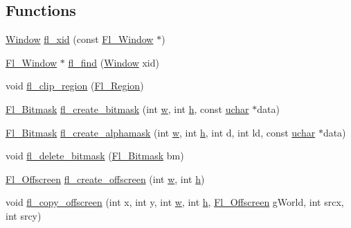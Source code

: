 \subsection*{Functions}
\begin{DoxyCompactItemize}
\item 
\hyperlink{mac_8_h_a213656d363e884b651cc92f58e863fc6}{Window} \hyperlink{mac_8_h_a87152d2ed84f9d97c6bf3150c7688261}{fl\+\_\+xid} (const \hyperlink{class_fl___window}{Fl\+\_\+\+Window} $\ast$)
\item 
\hyperlink{class_fl___window}{Fl\+\_\+\+Window} $\ast$ \hyperlink{mac_8_h_aa8b7258b5a56207a475571df260a32ab}{fl\+\_\+find} (\hyperlink{mac_8_h_a213656d363e884b651cc92f58e863fc6}{Window} xid)
\item 
void \hyperlink{group__fl__drawings_gab12cb4aaa22092a0f2ae3d349c57f234}{fl\+\_\+clip\+\_\+region} (\hyperlink{mac_8_h_ac80c9f95cc93c989c5a953a749f45cb6}{Fl\+\_\+\+Region})
\item 
\hyperlink{mac_8_h_a90133b6f8cfb11ab81d83b2c4d91310d}{Fl\+\_\+\+Bitmask} \hyperlink{mac_8_h_a99e81bfdc18ac333efdc08ae52288020}{fl\+\_\+create\+\_\+bitmask} (int \hyperlink{forms_8_h_aac374e320caaadeca4874add33b62af2}{w}, int \hyperlink{forms_8_h_a7e427ba5b307f9068129699250690066}{h}, const \hyperlink{fl__types_8h_a65f85814a8290f9797005d3b28e7e5fc}{uchar} $\ast$data)
\item 
\hyperlink{mac_8_h_a90133b6f8cfb11ab81d83b2c4d91310d}{Fl\+\_\+\+Bitmask} \hyperlink{mac_8_h_af5567e13b18547cd9fb62385004e3d74}{fl\+\_\+create\+\_\+alphamask} (int \hyperlink{forms_8_h_aac374e320caaadeca4874add33b62af2}{w}, int \hyperlink{forms_8_h_a7e427ba5b307f9068129699250690066}{h}, int d, int ld, const \hyperlink{fl__types_8h_a65f85814a8290f9797005d3b28e7e5fc}{uchar} $\ast$data)
\item 
void \hyperlink{mac_8_h_aa5112223a06ba80ee3bbc0608e9ece75}{fl\+\_\+delete\+\_\+bitmask} (\hyperlink{mac_8_h_a90133b6f8cfb11ab81d83b2c4d91310d}{Fl\+\_\+\+Bitmask} bm)
\item 
\hyperlink{mac_8_h_ad24d9679e17ea5ffa910ed355d4df340}{Fl\+\_\+\+Offscreen} \hyperlink{mac_8_h_a22259d434be43b30f74bfb3e96c5fdab}{fl\+\_\+create\+\_\+offscreen} (int \hyperlink{forms_8_h_aac374e320caaadeca4874add33b62af2}{w}, int \hyperlink{forms_8_h_a7e427ba5b307f9068129699250690066}{h})
\item 
void \hyperlink{mac_8_h_aa30661741226e267ecd17f3e6c1d9f61}{fl\+\_\+copy\+\_\+offscreen} (int x, int y, int \hyperlink{forms_8_h_aac374e320caaadeca4874add33b62af2}{w}, int \hyperlink{forms_8_h_a7e427ba5b307f9068129699250690066}{h}, \hyperlink{mac_8_h_ad24d9679e17ea5ffa910ed355d4df340}{Fl\+\_\+\+Offscreen} g\+World, int srcx, int srcy)

\end{DoxyCompactItemize}
